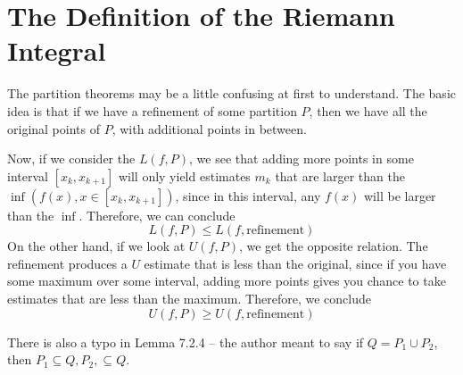 
\setcounter{section}{1}
\section{The Definition of the Riemann Integral}
\setcounter{exercise}{0}

The partition theorems may be a little confusing at first to understand.
The basic idea is that if we have a refinement of some partition $P$,
then we have all the original points of $P$, with additional points 
in between.

Now, if we consider the $L(f, P)$, we see that adding more points 
in some interval $[x_k, x_{k+1}]$ 
will only yield estimates $m_k$ that are larger than the $\inf(f(x), x \in [x_k, x_{k+1}])$,
since in this interval, any $f(x)$ will be larger than the $\inf$.
Therefore, we can conclude 
\begin{equation*}
  L(f, P) \leq L(f, \text{refinement})
\end{equation*}
On the other hand, if we look at $U(f, P)$, we get the opposite relation.
The refinement produces a $U$ estimate that is less than the original, 
since if you have some maximum over some interval, adding more points 
gives you chance to take estimates that are less than the maximum.
Therefore, we conclude 
\begin{equation*}
  U(f, P) \geq U(f, \text{refinement})
\end{equation*}

There is also a typo in Lemma 7.2.4 -- the author meant to say 
if $Q = P_1 \cup P_2$, then $P_1 \subseteq Q, P_2, \subseteq Q$.

\bx{

}